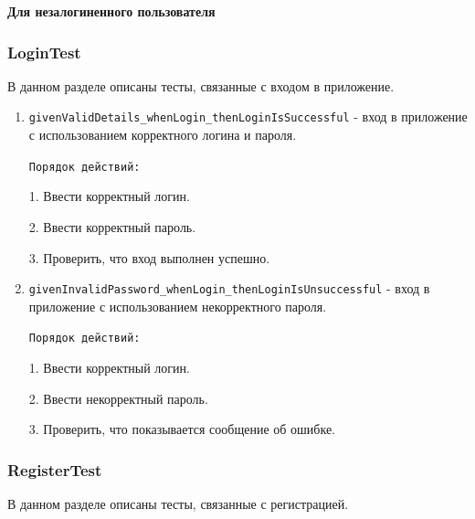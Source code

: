 \documentclass[a4paper, 14pt]{article}
\begin{document}
\textbf{Для незалогиненного пользователя}
\subsubsection{LoginTest}

В данном разделе описаны тесты, связанные с входом в приложение.

\begin{enumerate}
    \item \texttt{givenValidDetails\_whenLogin\_thenLoginIsSuccessful} - вход в приложение с использованием корректного логина и пароля.

    \texttt{Порядок действий:}
    
    1. Ввести корректный логин.
    
    2. Ввести корректный пароль.

    3. Проверить, что вход выполнен успешно.
    \item \texttt{givenInvalidPassword\_whenLogin\_thenLoginIsUnsuccessful} - вход в приложение с использованием некорректного пароля.

    \texttt{Порядок действий:}
    
    1. Ввести корректный логин.
    
    2. Ввести некорректный пароль.

    3. Проверить, что показывается сообщение об ошибке.
\end{enumerate}

\subsubsection{RegisterTest}

В данном разделе описаны тесты, связанные с регистрацией.
\end{document}
